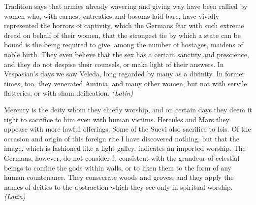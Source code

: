 
Tradition says that armies already wavering and giving way have been rallied by women who, with earnest entreaties and bosoms laid bare, have vividly represented the horrors of captivity, which the Germans fear with such extreme dread on behalf of their women, that the strongest tie by which a state can be bound is the being required to give, among the number of hostages, maidens of noble birth. They even believe that the sex has a certain sanctity and prescience, and they do not despise their counsels, or make light of their answers. In Vespasian's days we saw Veleda, long regarded by many as a divinity. In former times, too, they venerated Aurinia, and many other women, but not with servile flatteries, or with sham deification. \emph{(Latin)}


Mercury is the deity whom they chiefly worship, and on certain days they deem it right to sacrifice to him even with human victims. Hercules and Mars they appease with more lawful offerings. Some of the Suevi also sacrifice to Isis. Of the occasion and origin of this foreign rite I have discovered nothing, but that the image, which is fashioned like a light galley, indicates an imported worship. The Germans, however, do not consider it consistent with the grandeur of celestial beings to confine the gods within walls, or to liken them to the form of any human countenance. They consecrate woods and groves, and they apply the names of deities to the abstraction which they see only in spiritual worship. \emph{(Latin)}


